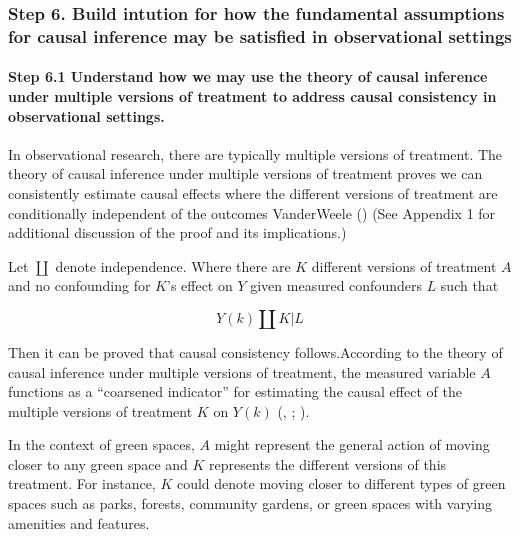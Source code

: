 \documentclass[
  singlecolumn]{article}
\let\oldparagraph\paragraph
\renewcommand{\paragraph}[1]{\oldparagraph{#1}\mbox{}}
\begin{document}
\subsubsection{Step 6. Build intution for how the fundamental
assumptions for causal inference may be satisfied in observational
settings}\label{step-6.-build-intution-for-how-the-fundamental-assumptions-for-causal-inference-may-be-satisfied-in-observational-settings}

\paragraph{\texorpdfstring{\textbf{Step 6.1 Understand how we may use
the theory of causal inference under multiple versions of treatment to
address causal consistency in observational
settings}.}{Step 6.1 Understand how we may use the theory of causal inference under multiple versions of treatment to address causal consistency in observational settings.}}\label{step-6.1-understand-how-we-may-use-the-theory-of-causal-inference-under-multiple-versions-of-treatment-to-address-causal-consistency-in-observational-settings.}

In observational research, there are typically multiple versions of
treatment. The theory of causal inference under multiple versions of
treatment proves we can consistently estimate causal effects where the
different versions of treatment are conditionally independent of the
outcomes VanderWeele () (See
Appendix 1 for additional discussion of the proof and its implications.)

Let \(\coprod\) denote independence. Where there are \(K\) different
versions of treatment \(A\) and no confounding for \(K\)'s effect on
\(Y\) given measured confounders \(L\) such that

\[
Y(k) \coprod K | L
\]

Then it can be proved that causal consistency follows.According to the
theory of causal inference under multiple versions of treatment, the
measured variable \(A\) functions as a ``coarsened indicator'' for
estimating the causal effect of the multiple versions of treatment \(K\)
on \(Y(k)\) (,
;
).

In the context of green spaces, \(A\) might represent the general action
of moving closer to any green space and \(K\) represents the different
versions of this treatment. For instance, \(K\) could denote moving
closer to different types of green spaces such as parks, forests,
community gardens, or green spaces with varying amenities and features.
\end{document}
